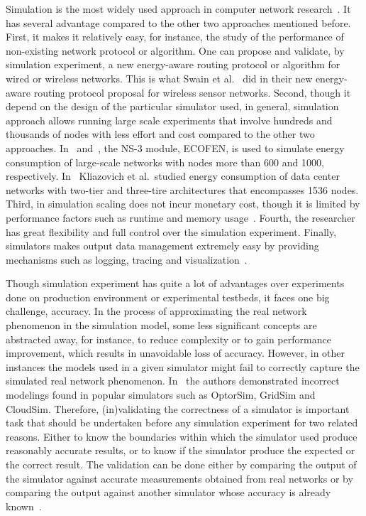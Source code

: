Simulation is the most widely used approach in computer network research~\cite{DBLP:conf/icc/WeingartnerLW09}. It has several advantage compared to the other two approaches mentioned before. First, it makes it relatively easy, for instance, the study of the performance of non-existing network protocol or algorithm. One can propose and validate, by simulation experiment, a new energy-aware routing protocol or algorithm for wired or wireless networks. This is what Swain et al.~\cite{DBLP:conf/aina/SwainHC10} did in their new energy-aware routing protocol proposal for wireless sensor networks. Second, though it depend on the design of the particular simulator used, in general, simulation approach allows running large scale experiments that involve hundreds and thousands of nodes with less effort and cost compared to the other two approaches. In~\cite{DBLP:conf/wowmom/OrgerieLLL11} and~\cite{DBLP:conf/cloudnet/CorneaOL14}, the NS-3 module, ECOFEN, is used to simulate energy consumption of large-scale networks with nodes more than 600 and 1000, respectively. In~\cite{DBLP:journals/tjs/KliazovichBK12} Kliazovich et al.~studied energy consumption of data center networks with two-tier and three-tire architectures that encompasses 1536 nodes. Third, in simulation scaling does not incur monetary cost, though it is limited by performance factors such as runtime and memory usage~\cite{DBLP:conf/icc/WeingartnerLW09}. Fourth, the researcher has great flexibility and full control over the simulation experiment. Finally, simulators makes output data management extremely easy by providing mechanisms such as logging, tracing and visualization~\cite{ns3,DBLP:journals/jpdc/CasanovaGLQS14}.  

Though simulation experiment has quite a lot of advantages over experiments done on production environment or experimental testbeds, it faces one big challenge, accuracy. In the process of approximating the real network phenomenon in the simulation model, some less significant concepts are abstracted away, for instance, to reduce complexity or to gain performance improvement, which results in unavoidable loss of accuracy. However, in other instances the models used in a given simulator might fail to correctly capture the simulated real network phenomenon. In~\cite{DBLP:journals/tomacs/VelhoSCL13} the authors demonstrated incorrect modelings found in popular simulators such as OptorSim, GridSim and CloudSim. Therefore, (in)validating the correctness of a simulator is important task that should be undertaken before any simulation experiment for two related reasons. Either to know the boundaries within which the simulator used produce reasonably accurate results, or to know if the simulator produce the expected or the correct result. The validation can be done either by comparing the output of the simulator against accurate measurements obtained from real networks or by comparing the output against another simulator whose accuracy is already known~\cite{DBLP:books/daglib/0076234}.
